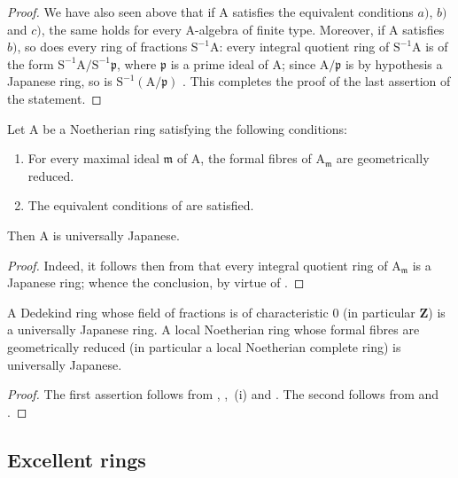 \begin{proof}
We have also seen above that if $\mathrm{A}$ satisfies the equivalent conditions $a)$, $b)$ and $c)$, the same holds for every $\mathrm{A}$-algebra of finite type. Moreover, if $\mathrm{A}$ satisfies $b)$, so does every ring of fractions $\mathrm{S}^{-1}\mathrm{A}$: every integral quotient ring of $\mathrm{S}^{-1}\mathrm{A}$ is of the form $\mathrm{S}^{-1}\mathrm{A}/\mathrm{S}^{-1}\mathfrak{p}$, where $\mathfrak{p}$ is a prime ideal of $\mathrm{A}$; since $\mathrm{A}/\mathfrak{p}$ is by hypothesis a Japanese ring, so is $\mathrm{S}^{-1}(\mathrm{A}/\mathfrak{p})$ . This completes the proof of the last assertion of the statement.
\end{proof}

\begin{corollary}[7.7.3]
\label{IV.7.7.3}
Let $\mathrm{A}$ be a Noetherian ring satisfying the following conditions:
\begin{enumerate}[label=(\roman*)]
  \item For every maximal ideal $\mathfrak{m}$ of $\mathrm{A}$, the formal fibres of $\mathrm{A}_\mathfrak{m}$ are geometrically reduced.
  \item The equivalent conditions of  are satisfied.
\end{enumerate}
Then $\mathrm{A}$ is universally Japanese.
\end{corollary}

\begin{proof}
Indeed, it follows then from  that every integral quotient ring of $\mathrm{A}_\mathfrak{m}$ is a Japanese ring; whence the conclusion, by virtue of .
\end{proof}

\begin{corollary}[7.7.4]
\label{IV.7.7.4}
A Dedekind ring whose field of fractions is of characteristic $0$ (in particular $\mathbf{Z}$) is a universally Japanese ring. A local Noetherian ring whose formal fibres are geometrically reduced (in particular a local Noetherian complete ring) is universally Japanese.
\end{corollary}

\begin{proof}
The first assertion follows from , ,~(i) and . The second follows from  and .
\end{proof}


\subsection{Excellent rings}
\label{subsection:IV.7.8}

